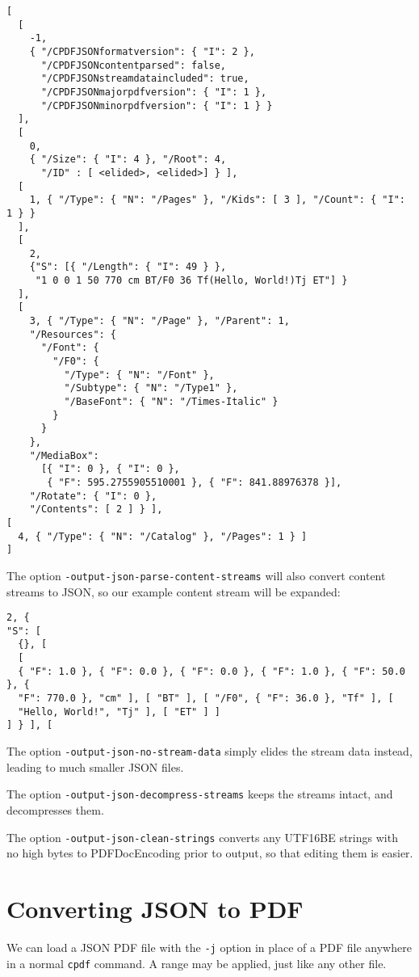 \documentclass{book}
\begin{document}
{\small\begin{verbatim}
[
  [
    -1,
    { "/CPDFJSONformatversion": { "I": 2 },
      "/CPDFJSONcontentparsed": false,
      "/CPDFJSONstreamdataincluded": true,
      "/CPDFJSONmajorpdfversion": { "I": 1 },
      "/CPDFJSONminorpdfversion": { "I": 1 } }
  ],
  [
    0,
    { "/Size": { "I": 4 }, "/Root": 4,
      "/ID" : [ <elided>, <elided>] } ],
  [
    1, { "/Type": { "N": "/Pages" }, "/Kids": [ 3 ], "/Count": { "I": 1 } }
  ],
  [
    2,
    {"S": [{ "/Length": { "I": 49 } },
     "1 0 0 1 50 770 cm BT/F0 36 Tf(Hello, World!)Tj ET"] }
  ],
  [
    3, { "/Type": { "N": "/Page" }, "/Parent": 1,
    "/Resources": {
      "/Font": {
        "/F0": {
          "/Type": { "N": "/Font" },
          "/Subtype": { "N": "/Type1" },
          "/BaseFont": { "N": "/Times-Italic" }
        }
      }
    },
    "/MediaBox":
      [{ "I": 0 }, { "I": 0 },
       { "F": 595.2755905510001 }, { "F": 841.88976378 }],
    "/Rotate": { "I": 0 },
    "/Contents": [ 2 ] } ],
[
  4, { "/Type": { "N": "/Catalog" }, "/Pages": 1 } ]
]\end{verbatim}}

\noindent The option \texttt{-output-json-parse-content-streams} will also convert content streams to JSON, so our example content stream will be expanded:


{\small\begin{verbatim}
2, {
"S": [
  {}, [
  [
  { "F": 1.0 }, { "F": 0.0 }, { "F": 0.0 }, { "F": 1.0 }, { "F": 50.0 }, {
  "F": 770.0 }, "cm" ], [ "BT" ], [ "/F0", { "F": 36.0 }, "Tf" ], [
  "Hello, World!", "Tj" ], [ "ET" ] ]
] } ], [
\end{verbatim}}

\noindent The option \texttt{-output-json-no-stream-data} simply elides the stream data instead, 
leading to much smaller JSON files. 

The option \texttt{-output-json-decompress-streams} keeps the streams intact, and decompresses them.

The option \texttt{-output-json-clean-strings} converts any UTF16BE strings with no high bytes to PDFDocEncoding prior to output, so that editing them is easier. 

\section{Converting JSON to PDF}

We can load a JSON PDF file with the \texttt{-j} option in place of a PDF file anywhere in a normal \texttt{cpdf} command. A range may be applied, just like any other file. 
\end{document}
